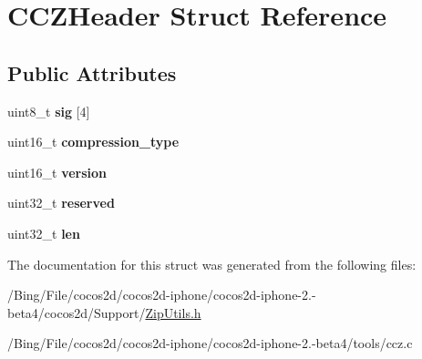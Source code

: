 \hypertarget{struct_c_c_z_header}{\section{C\-C\-Z\-Header Struct Reference}
\label{struct_c_c_z_header}
}
\subsection*{Public Attributes}
\begin{DoxyCompactItemize}
\item 
\hypertarget{struct_c_c_z_header_a1190946bd38ffc821b4f6a81c3ac7d17}{uint8\-\_\-t {\bfseries sig} \mbox{[}4\mbox{]}}\label{struct_c_c_z_header_a1190946bd38ffc821b4f6a81c3ac7d17}

\item 
\hypertarget{struct_c_c_z_header_ab3a7d6f8348930ba9de62a3076b64fcf}{uint16\-\_\-t {\bfseries compression\-\_\-type}}\label{struct_c_c_z_header_ab3a7d6f8348930ba9de62a3076b64fcf}

\item 
\hypertarget{struct_c_c_z_header_add95885b77728117e247018dc2ddc6ce}{uint16\-\_\-t {\bfseries version}}\label{struct_c_c_z_header_add95885b77728117e247018dc2ddc6ce}

\item 
\hypertarget{struct_c_c_z_header_a9baf68ce59f6f218081a79be2483fe0e}{uint32\-\_\-t {\bfseries reserved}}\label{struct_c_c_z_header_a9baf68ce59f6f218081a79be2483fe0e}

\item 
\hypertarget{struct_c_c_z_header_a5c2b98b6007437a8401104c4af9f7928}{uint32\-\_\-t {\bfseries len}}\label{struct_c_c_z_header_a5c2b98b6007437a8401104c4af9f7928}

\end{DoxyCompactItemize}


The documentation for this struct was generated from the following files\-:\begin{DoxyCompactItemize}
\item 
/\-Bing/\-File/cocos2d/cocos2d-\/iphone/cocos2d-\/iphone-\/2.-\/beta4/cocos2d/\-Support/\hyperlink{_zip_utils_8h}{Zip\-Utils.\-h}\item 
/\-Bing/\-File/cocos2d/cocos2d-\/iphone/cocos2d-\/iphone-\/2.-\/beta4/tools/ccz.\-c\end{DoxyCompactItemize}
